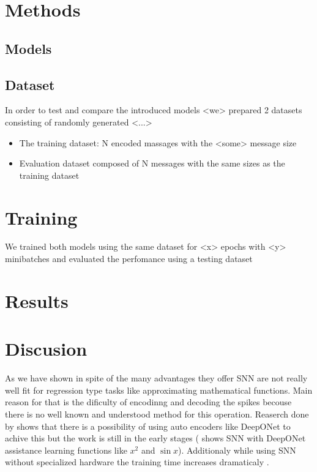 \documentclass{article}
\begin{document}
\section{Methods}
\subsection{Models}


\subsection{Dataset}

In order to test and compare the introduced models <we> prepared 2 datasets consisting of randomly generated <...>

\begin{itemize}
    \item The training dataset: N encoded massages with the <some> message size
    \item Evaluation dataset composed of N messages with the same sizes as the training dataset
\end{itemize}

\section{Training}

We trained both models using the same dataset for <x> epochs with <y> minibatches and evaluated the perfomance using a testing dataset 


\section{Results}


\section{Discusion}

As we have shown in spite of the many advantages they offer SNN are not really well fit for regression type tasks like approximating mathematical functions. Main reason for that is the dificulty of encodinng and decoding the spikes becouse there is no well known and understood method for this operation. Reaserch done by \cite{kahana_function_2022} shows that there is a possibility of using auto encoders like DeepONet \cite{lu_learning_2021} to achive this but the work is still in the early stages (\cite{kahana_function_2022} shows SNN with DeepONet assistance learning functions like $x^2$ and $\sin{x}$). Additionaly while using SNN without specialized hardware\cite{bouvier_spiking_2019} the training time increases dramaticaly \cite{kahana_function_2022}.

\printbibliography
\end{document}
